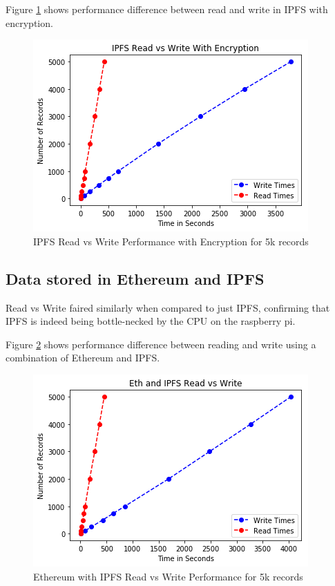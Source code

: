 \documentclass[11pt,openright]{report}
\begin{document}
Figure \ref{fig:graph_ipfs_readvwrite_wencr} shows performance difference between read and write in IPFS with encryption.

\begin{figure}
    \centering
    \includegraphics[scale=1]{results/graphs/IPFS_Read_v_Write_Encr.png}
    \caption{IPFS Read vs Write Performance with Encryption for 5k records}
    \label{fig:graph_ipfs_readvwrite_wencr}
\end{figure}

\subsection{Data stored in Ethereum and IPFS}
Read vs Write faired similarly when compared to just IPFS, confirming that IPFS is indeed being bottle-necked by the CPU on the raspberry pi.

Figure \ref{fig:graph_eth_ipfs_readvwrite} shows performance difference between reading and write using a combination of Ethereum and IPFS.

\begin{figure}
    \centering
    \includegraphics[scale=1]{results/graphs/Eth_IPFS_Read_v_Write.png}
    \caption{Ethereum with IPFS Read vs Write Performance for 5k records}
    \label{fig:graph_eth_ipfs_readvwrite}
\end{figure}
\end{document}
